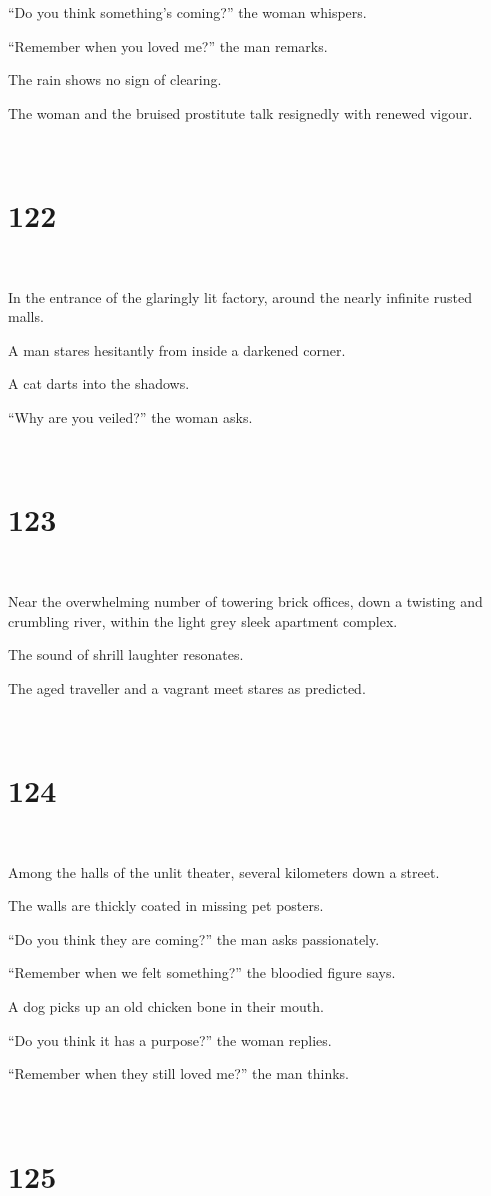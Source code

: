 \documentclass{report}
\begin{document}
``Do you think something's coming?'' the woman whispers.

``Remember when you loved me?'' the man remarks.

The rain shows no sign of clearing.

The woman and the bruised prostitute talk resignedly with renewed vigour.

~
\chapter*{122}
~

In the entrance of the glaringly lit factory, around the nearly infinite rusted malls.

A man stares hesitantly from inside a darkened corner.

A cat darts into the shadows.

``Why are you veiled?'' the woman asks.

~
\chapter*{123}
~

Near the overwhelming number of towering brick offices, down a twisting and crumbling river, within the light grey sleek apartment complex.

The sound of shrill laughter resonates.

The aged traveller and a vagrant meet stares as predicted.

~
\chapter*{124}
~

Among the halls of the unlit theater, several kilometers down a street.

The walls are thickly coated in missing pet posters.

``Do you think they are coming?'' the man asks passionately.

``Remember when we felt something?'' the bloodied figure says.

A dog picks up an old chicken bone in their mouth.

``Do you think it has a purpose?'' the woman replies.

``Remember when they still loved me?'' the man thinks.

~
\chapter*{125}
~
\end{document}
